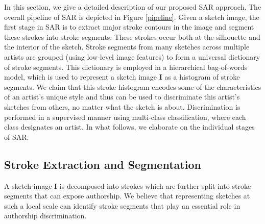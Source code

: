 In this section, we give a detailed description of our proposed SAR approach. The overall pipeline of SAR is depicted in Figure \ref{pipeline}. Given a sketch image, the first stage in SAR is to extract major stroke contours in the image and segment these strokes into stroke segments. These strokes occur both at the silhouette and the interior of the sketch. Stroke segments from many sketches across multiple artists are grouped (using low-level image features) to form a universal dictionary of stroke segments. This dictionary is employed in a hierarchical bag-of-words model, which is used to represent a sketch image $\mathbf{I}$ as a histogram of stroke segments. We claim that this stroke histogram encodes some of the characteristics of an artist's unique style and thus can be used to discriminate this artist's sketches from others, no matter what the sketch is about. Discrimination is performed in a supervised manner using multi-class classification, where each class designates an artist. In what follows, we elaborate on the individual stages of SAR.
\vspace{-4mm}
\subsection{Stroke Extraction and Segmentation}\label{subsec: segmentation}
\vspace{-1mm}
A sketch image $\mathbf{I}$ is decomposed into strokes which are further split into stroke segments that can expose authorship. We believe that representing sketches at such a local scale can identify stroke segments that play an essential role in authorship discrimination.

